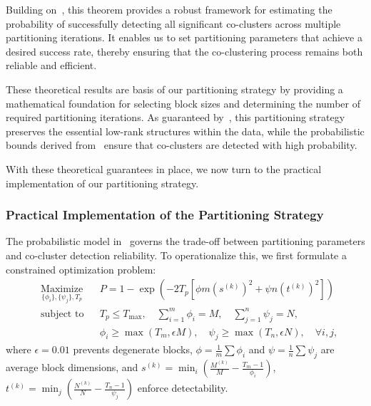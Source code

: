 \documentclass[journal]{IEEEtran}
\begin{document}
Building on~, this theorem provides a robust framework for estimating the probability of successfully detecting all significant co-clusters across multiple partitioning iterations. It enables us to set partitioning parameters that achieve a desired success rate, thereby ensuring that the co-clustering process remains both reliable and efficient.

These theoretical results are basis of our partitioning strategy by providing a mathematical foundation for selecting block sizes and determining the number of required partitioning iterations. As guaranteed by~, this partitioning strategy preserves the essential low-rank structures within the data, while the probabilistic bounds derived from~ ensure that co-clusters are detected with high probability.

With these theoretical guarantees in place, we now turn to the practical implementation of our partitioning strategy.


\subsubsection{Practical Implementation of the Partitioning Strategy}
\label{subsec:practical_implementation}
The probabilistic model in~ governs the trade-off between partitioning parameters and co-cluster detection reliability. To operationalize this, we first formulate a constrained optimization problem:
\begin{equation}
    \begin{aligned}
         & \underset{\{\phi_i\}, \{\psi_j\}, T_p}{\text{Maximize}}
         &                                                         & P = 1 - \exp\left( -2 T_p \left[ \phi m (s^{(k)})^2 + \psi n (t^{(k)})^2 \right] \right)                                                                                                  \\
         & \text{subject to}
         &                                                         & T_p \leq T_{\text{max}}, \quad \sum_{i=1}^m \phi_i = M, \quad \sum_{j=1}^n \psi_j = N,                                                                                                    \\
         &                                                         &                                                                                          & \phi_i \geq \max(T_m, \epsilon M), \quad \psi_j \geq \max(T_n, \epsilon N), \quad \forall i,j,
    \end{aligned}
\end{equation}
where $\epsilon = 0.01$ prevents degenerate blocks, $\phi = \frac{1}{m}\sum \phi_i$ and $\psi = \frac{1}{n}\sum \psi_j$ are average block dimensions, and $s^{(k)} = \min_i \left( \frac{M^{(k)}}{M} - \frac{T_m-1}{\phi_i} \right)$, $t^{(k)} = \min_j \left( \frac{N^{(k)}}{N} - \frac{T_n-1}{\psi_j} \right)$ enforce detectability.
\end{document}
